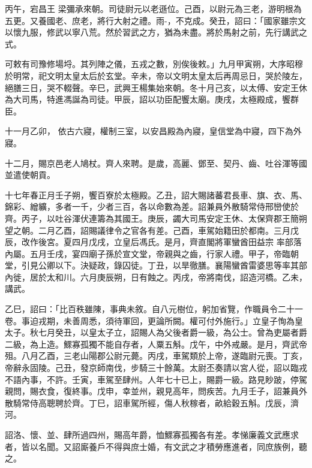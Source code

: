 \begin{pinyinscope}
 丙午，宕昌王
 梁彌承來朝。司徒尉元以老遜位。己酉，以尉元為三老，游明根為五更。又養國老、庶老，將行大射之禮。雨-，不克成。癸丑，詔曰：「國家雖宗文以懷九服，修武以寧八荒。然於習武之方，猶為未盡。將於馬射之前，先行講武之式。



 可敕有司豫修場埒。其列陣之儀，五戎之數，別俟後敕。」九月甲寅朔，大序昭穆於明常，祀文明太皇太后於玄堂。辛未，帝以文明太皇太后再周忌日，哭於陵左，絕膳三日，哭不輟聲。辛巳，武興王楊集始來朝。冬十月己亥，以太傅、安定王休為大司馬，特進馮誕為司徒。甲辰，詔以功臣配饗太廟。庚戌，太極殿成，饗群臣。



 十一月乙卯，
 依古六寢，權制三室，以安昌殿為內寢，皇信堂為中寢，四下為外寢。



 十二月，賜京邑老人鳩杖。齊人來聘。是歲，高麗、鄧至、契丹、齒、吐谷渾等國並遣使朝貢。



 十七年春正月壬子朔，饗百寮於太極殿。乙丑，詔大賜諸蕃君長車、旗、衣、馬、錦彩、繒纊，多者一千，少者三百，各以命數為差。詔兼員外散騎常侍邢巒使於齊。丙子，以吐谷渾伏連籌為其國王。庚辰，蠲大司馬安定王休、太保齊郡王簡朔望之朝。二月乙酉，詔賜議律令之官各有差。己酉，車駕始籍田於都南。三月戊辰，改作後宮。夏四月戊戌，立皇后馮氏。是月，齊直閣將軍蠻酋田益宗
 率部落內屬。五月壬戌，宴四廟子孫於宣文堂，帝親與之齒，行家人禮。甲子，帝臨朝堂，引見公卿以下。決疑政，錄囚徒。丁丑，以旱徹膳。襄陽蠻酋雷婆思等率其部內徙，居於太和川。六月庚辰朔，日有蝕之。丙戌，帝將南伐，詔造河橋。乙未，講武。



 乙巳，詔曰：「比百秩雖陳，事典未敘。自八元樹位，躬加省覽，作職員令二十一卷。事迫戎期，未善周悉，須待軍回，更論所闕。權可付外施行。」立皇子恂為皇太子。秋七月癸丑，以皇太子立，詔賜人為父後者爵一級，為公士。曾為吏屬者爵二級，為上造。鰥寡孤獨不能自存者，人粟五斛。戊午，中外戒嚴。是月，齊武帝
 殂。八月乙酉，三老山陽郡公尉元薨。丙戌，車駕類於上帝，遂臨尉元喪。丁亥，帝辭永固陵。己丑，發京師南伐，步騎三十餘萬。太尉丕奏請以宮人從，詔以臨戎不語內事，不許。壬寅，車駕至肆州。人年七十已上，賜爵一級。路見眇跛，停駕親問，賜衣食，復終事。戊申，幸並州，親見高年，問疾苦。九月壬子，詔兼員外散騎常侍高聰聘於齊。丁巳，詔車駕所經，傷人秋稼者，畝給穀五斛。戊辰，濟河。



 詔洛、懷、並、肆所過四州，賜高年爵，恤鰥寡孤獨各有差。孝悌廉義文武應求者，皆以名聞。又詔廝養戶不得與庶士婚，有文武之才積勞應進者，同庶族例，聽之。




\end{pinyinscope}
